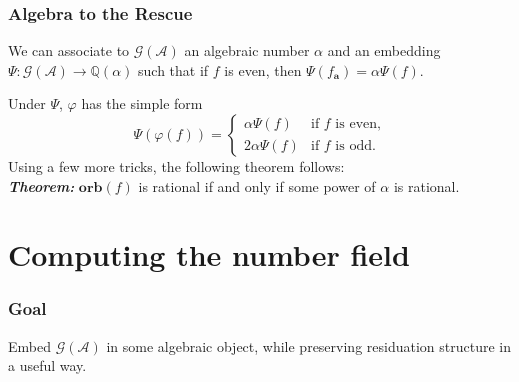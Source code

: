 \documentclass{beamer}
\newcommand{\Q}{\mathbb{Q}}
\newcommand{\ch}[1]{\mathbf{#1}}
\newcommand{\A}{\mathcal{A}}
\newcommand{\gp}{\mathcal{G}}
\newcommand{\res}[2]{{{#1}_{\ch{#2}}}}
\newcommand{\orb}{\mathbf{orb}}
\begin{document}
\begin{frame}
    \frametitle{Algebra to the Rescue}
    We can associate to $\gp(\A)$ an algebraic number $\alpha$ and an embedding
    $\Psi: \gp(\A) \rightarrow \Q(\alpha)$ such that if $f$ is even, then
    $\Psi(\res{f}{a}) = \alpha\Psi(f)$.
    \pause

    \vspace{.3cm}
    Under $\Psi$, $\varphi$ has the simple form
    \[
        \Psi(\varphi(f)) = \begin{cases}
            \alpha \Psi(f) & \text{if $f$ is even,}\\
            2\alpha \Psi(f) & \text{if $f$ is odd.}
        \end{cases}
    \]
    \pause
    Using a few more tricks, the following theorem follows:\\
    \vspace{.3cm}
    {\bf \emph{Theorem:}} $\orb(f)$ is rational if and only if some power of
    $\alpha$ is rational.
\end{frame}

\section{Computing the number field}

\begin{frame}
    \frametitle{Goal}
    Embed $\gp(\A)$ in some algebraic object, while preserving residuation
    structure in a useful way.
\end{frame}
\end{document}
